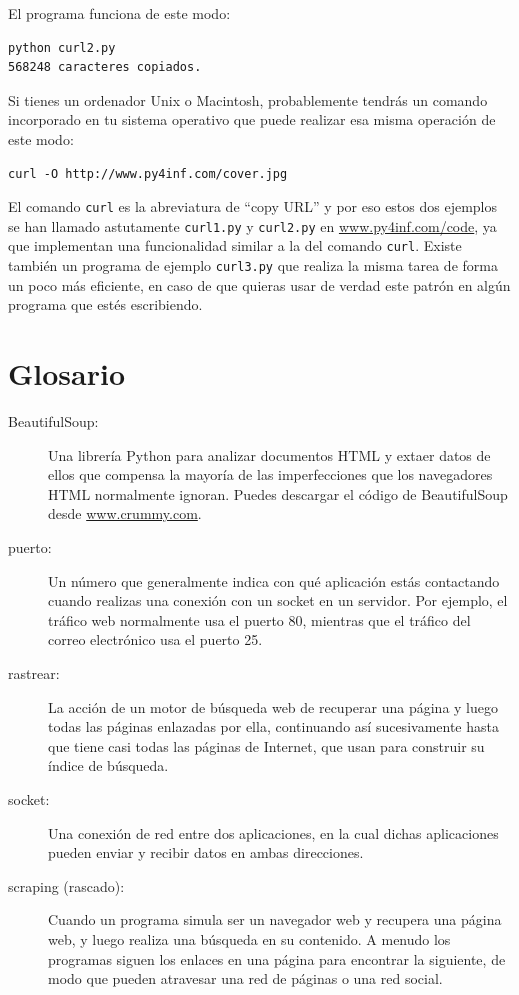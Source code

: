 El programa funciona de este modo:

\beforeverb
\begin{verbatim}
python curl2.py 
568248 caracteres copiados.
\end{verbatim}
\afterverb
%

Si tienes un ordenador Unix o Macintosh, probablemente tendrás un comando
incorporado en tu sistema operativo que puede realizar esa misma operación
de este modo:

\beforeverb
\begin{verbatim}
curl -O http://www.py4inf.com/cover.jpg
\end{verbatim}
\afterverb
%
El comando {\tt curl} es la abreviatura de ``copy URL'' y por eso estos dos
ejemplos se han llamado astutamente {\tt curl1.py} y {\tt curl2.py} en
\url{www.py4inf.com/code}, ya que implementan una funcionalidad similar
a la del comando {\tt curl}. Existe también un programa de ejemplo {\tt curl3.py}
que realiza la misma tarea de forma un poco más eficiente, en caso de
que quieras usar de verdad este patrón en algún programa que estés escribiendo.

\section{Glosario}

\begin{description}

\item[BeautifulSoup:] Una librería Python para analizar documentos HTML
y extaer datos de ellos
que compensa la mayoría de las imperfecciones que los navegadores HTML
normalmente ignoran.
Puedes descargar el código de BeautifulSoup
desde
\url{www.crummy.com}.

\item[puerto:] Un número que generalmente indica con qué aplicación
estás contactando cuando realizas una conexión con un socket en un servidor.
Por ejemplo, el tráfico web normalmente usa el puerto 80, mientras que el tráfico
del correo electrónico usa el puerto 25.

\item[rastrear:] La acción de un motor de búsqueda web de recuperar una página
y luego todas las páginas enlazadas por ella, continuando así sucesivamente hasta que
tiene casi todas las páginas de Internet, que
usan para construir su índice de búsqueda.

\item[socket:] Una conexión de red entre dos aplicaciones,
en la cual dichas aplicaciones pueden enviar y recibir datos en ambas direcciones.

\item[scraping (rascado):] Cuando un programa simula ser un navegador web y
recupera una página web, y luego realiza una búsqueda en su contenido.
A menudo los programas siguen los enlaces en una página para encontrar la
siguiente, de modo que pueden atravesar una red de páginas o una red social.

\end{description}


